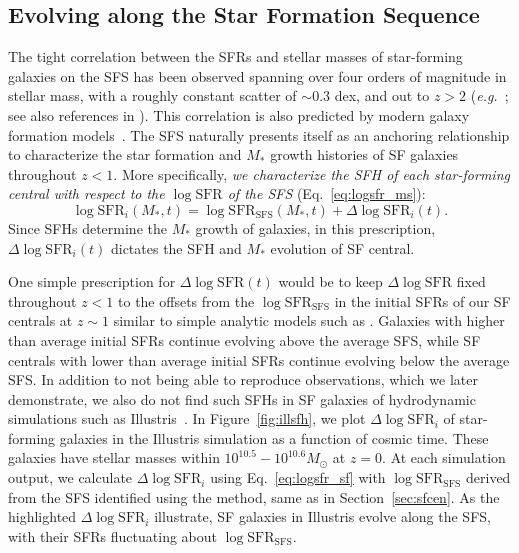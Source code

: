 \documentclass[12pt, letterpaper, preprint, tighten]{aastex62}
\newcommand{\beq}{\begin{equation}}
\newcommand{\eeq}{\end{equation}}
\newcommand{\logsfr}{\log\mathrm{SFR}}
\newcommand{\logsfrsfs}{\log\mathrm{SFR}_\mathrm{SFS}}
\begin{document}
\subsection{Evolving along the Star Formation Sequence} \label{sec:modelevol} 
The tight correlation between the SFRs and stellar masses of star-forming 
galaxies on the SFS has been observed spanning over four orders of magnitude 
in stellar mass, with a roughly constant scatter of ${\sim}0.3$ dex, and out 
to $z > 2$ 
(\emph{e.g.}~\citealt{noeske2007,daddi2007,elbaz2007,salim2007,santini2009,karim2011,whitaker2012,moustakas2013,lee2015}; see also references in \citealt{speagle2014}). 
This correlation is also predicted by modern galaxy formation models~\citep[][see 
\citealt{hahn2018a} and references therein]{somerville2015}. The SFS 
naturally presents itself as an anchoring relationship to characterize 
the star formation and $M_*$ growth histories of SF galaxies throughout $z < 1$. More 
specifically, \emph{we characterize the SFH of each star-forming central 
with respect to the $\logsfr$ of the SFS} (Eq.~\ref{eq:logsfr_ms}):
\beq \label{eq:logsfr_sf} 
\logsfr_i(M_*, t) = \logsfrsfs(M_*, t) + \Delta\logsfr_i(t).
\eeq
Since SFHs determine the $M_*$ growth of galaxies, in this prescription, 
$\Delta \logsfr_i(t)$ dictates the SFH and $M_*$ evolution of SF central.

One simple prescription for $\Delta \logsfr(t)$ would be to keep $\Delta \logsfr$ 
fixed throughout $z < 1$ to the offsets from the $\logsfrsfs$ in the 
initial SFRs of our SF centrals at $z\sim1$ similar to simple analytic 
models such as \cite{mitra2015}. Galaxies with higher than average 
initial SFRs continue evolving above the average SFS, while SF centrals 
with lower than average initial SFRs continue evolving below the average 
SFS. In addition to not being able to reproduce observations, which we
later demonstrate, we also do not find such SFHs in SF galaxies of 
hydrodynamic simulations such as Illustris~\citep{vogelsberger2014,genel2014}. 
In Figure~\ref{fig:illsfh}, we plot $\Delta \logsfr_i$ of star-forming 
galaxies in the Illustris simulation as a function of cosmic time. These 
galaxies have stellar masses within $10^{10.5}-10^{10.6}M_\odot$ at $z=0$. 
At each simulation output, we calculate $\Delta \logsfr_i$ using Eq.~\ref{eq:logsfr_sf}
with $\logsfrsfs$ derived from the SFS identified using the \cite{hahn2018a}
method, same as in Section~\ref{sec:sfcen}. As the highlighted $\Delta \logsfr_i$
illustrate, SF galaxies in Illustris evolve along the SFS, with
their SFRs fluctuating about $\logsfrsfs$.
\end{document}

